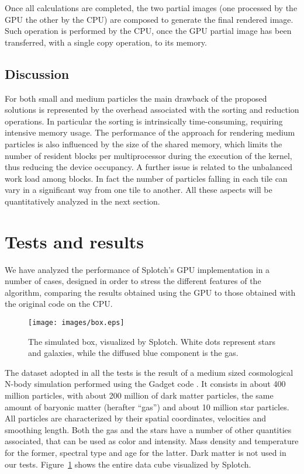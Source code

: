\documentclass[1p]{elsarticle}
\begin{document}
Once all calculations are completed, the two partial images (one processed by the GPU the other by the CPU) are composed to generate the final rendered image. Such operation is performed by the CPU, once the GPU partial image has been transferred, with a single copy operation, to its memory. 

\subsection{Discussion}
For both small and medium particles the main drawback of the proposed solutions
is represented by the overhead associated with the sorting and reduction operations. In particular the sorting is intrinsically time-consuming, requiring intensive memory usage.
The performance of the approach for rendering medium particles is also influenced
by the size of the shared memory, which limits the number of resident blocks
per multiprocessor during the execution of the kernel, thus reducing the device occupancy. 
A further issue is related to the unbalanced work load among blocks. In fact the number of particles falling in each tile can vary in a significant way from one tile to another. All these aspects will be quantitatively analyzed in the next section.

\section{Tests and results}
\label{sec:results}
We have analyzed the performance of Splotch's GPU implementation in a number of cases, designed in 
order to stress the different features of the algorithm, 
comparing the results 
obtained using the GPU to those obtained with the original code on the CPU. 

\begin{figure}
\centering
\texttt{[image: images/box.eps]}
\caption{The simulated box, visualized by Splotch. White dots represent stars and galaxies, while the 
diffused blue component is the gas.}
\label{fig:box}
\end{figure}

The dataset adopted in all the tests is the result of a medium sized cosmological 
N-body simulation performed using the Gadget code \cite{gadgeturl}. It consists in about 
400 million particles, with about 200 million of dark matter particles, the same amount 
of baryonic matter (herafter ``gas'') and about 10 million star particles. 
All particles are characterized by their spatial coordinates, velocities
and smoothing length. 
Both the gas and the stars have a number of other quantities associated, that can be used 
as color and intensity. Mass density and temperature for the former, spectral type and age
for the latter. Dark matter is not used in our tests. Figure~\ref{fig:box} shows 
the entire data cube visualized by Splotch.
\end{document}
